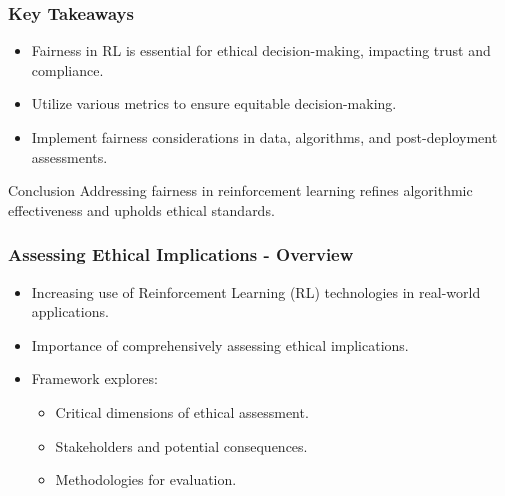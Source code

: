 \documentclass{beamer}
\begin{document}
\begin{frame}[fragile]
    \frametitle{Key Takeaways}
    \begin{itemize}
        \item Fairness in RL is essential for ethical decision-making, impacting trust and compliance.
        \item Utilize various metrics to ensure equitable decision-making.
        \item Implement fairness considerations in data, algorithms, and post-deployment assessments.
    \end{itemize}
    \begin{block}{Conclusion}
        Addressing fairness in reinforcement learning refines algorithmic effectiveness and upholds ethical standards.
    \end{block}
\end{frame}

\begin{frame}[fragile]
    \frametitle{Assessing Ethical Implications - Overview}
    \begin{itemize}
        \item Increasing use of Reinforcement Learning (RL) technologies in real-world applications.
        \item Importance of comprehensively assessing ethical implications.
        \item Framework explores:
        \begin{itemize}
            \item Critical dimensions of ethical assessment.
            \item Stakeholders and potential consequences.
            \item Methodologies for evaluation.
        \end{itemize}
    \end{itemize}
\end{frame}
\end{document}
